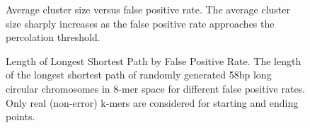 \documentclass{pnastwo}
\begin{document}
\begin{figure}
\label{fig:clustersize}
\caption{Average cluster size versus false positive rate. The average 
cluster size sharply increases as the false positive 
rate approaches the percolation threshold.
}
\end{figure}

\begin{figure}
\label{fig:diam}

\caption{Length of Longest Shortest Path by False Positive Rate. The
  length of the longest shortest path of randomly generated 58bp long
  circular chromosomes in 8-mer space for different false positive
  rates. Only real (non-error) k-mers are considered for starting and
  ending points.}
\end{figure}
\end{document}
